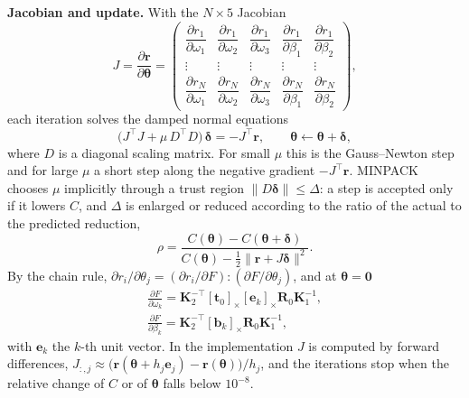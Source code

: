 \documentclass[journal]{IEEEtran}
\newcommand{\R}{\mathbf{R}}
\newcommand{\tv}{\mathbf{t}}
\newcommand{\K}{\mathbf{K}}
\begin{document}
\textbf{Jacobian and update.} With the $N\times5$ Jacobian
\begin{equation}
  J=\frac{\partial\mathbf{r}}{\partial\boldsymbol\theta}=
  \begin{pmatrix}
    \dfrac{\partial r_1}{\partial\omega_1}&\dfrac{\partial r_1}{\partial\omega_2}&\dfrac{\partial r_1}{\partial\omega_3}&\dfrac{\partial r_1}{\partial\beta_1}&\dfrac{\partial r_1}{\partial\beta_2}\\[2pt]
    \vdots&\vdots&\vdots&\vdots&\vdots\\
    \dfrac{\partial r_N}{\partial\omega_1}&\dfrac{\partial r_N}{\partial\omega_2}&\dfrac{\partial r_N}{\partial\omega_3}&\dfrac{\partial r_N}{\partial\beta_1}&\dfrac{\partial r_N}{\partial\beta_2}
  \end{pmatrix},
\end{equation}
each iteration solves the damped normal equations
\begin{equation}
  \big(J^\top J+\mu\,D^\top D\big)\,\boldsymbol\delta=-J^\top\mathbf{r},\qquad \boldsymbol\theta\leftarrow\boldsymbol\theta+\boldsymbol\delta ,
\end{equation}
where $D$ is a diagonal scaling matrix. For small $\mu$ this is the Gauss--Newton step and for large $\mu$ a short step along the negative gradient $-J^\top\mathbf{r}$. MINPACK chooses $\mu$ implicitly through a trust region $\|D\boldsymbol\delta\|\le\Delta$: a step is accepted only if it lowers $C$, and $\Delta$ is enlarged or reduced according to the ratio of the actual to the predicted reduction,
\begin{equation}
  \rho=\frac{C(\boldsymbol\theta)-C(\boldsymbol\theta+\boldsymbol\delta)}{C(\boldsymbol\theta)-\tfrac12\|\mathbf{r}+J\boldsymbol\delta\|^2}.
\end{equation}
By the chain rule, $\partial r_i/\partial\theta_j=(\partial r_i/\partial F):(\partial F/\partial\theta_j)$, and at $\boldsymbol\theta=\mathbf{0}$
\begin{gather}
  \frac{\partial F}{\partial\omega_k}=\K_2^{-\top}[\tv_0]_\times[\mathbf{e}_k]_\times\R_0\K_1^{-1},\\
  \frac{\partial F}{\partial\beta_k}=\K_2^{-\top}[\mathbf{b}_k]_\times\R_0\K_1^{-1},
\end{gather}
with $\mathbf{e}_k$ the $k$-th unit vector. In the implementation $J$ is computed by forward differences, $J_{:,j}\approx\big(\mathbf{r}(\boldsymbol\theta+h_j\mathbf{e}_j)-\mathbf{r}(\boldsymbol\theta)\big)/h_j$, and the iterations stop when the relative change of $C$ or of $\boldsymbol\theta$ falls below $10^{-8}$.
\end{document}
